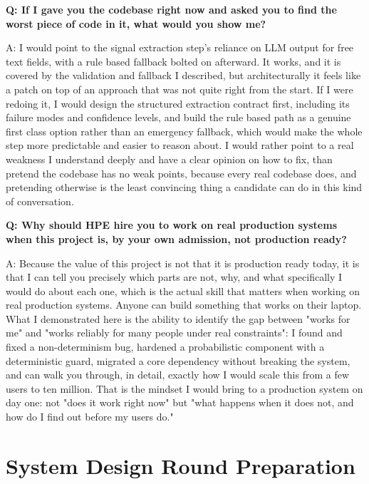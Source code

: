 \documentclass[11pt,a4paper]{report}
\begin{document}
\begin{qabox}
\textbf{Q: If I gave you the codebase right now and asked you to find the worst piece of code in it, what would you show me?}

A: I would point to the signal extraction step's reliance on LLM output for free text fields, with a rule based fallback bolted on afterward. It works, and it is covered by the validation and fallback I described, but architecturally it feels like a patch on top of an approach that was not quite right from the start. If I were redoing it, I would design the structured extraction contract first, including its failure modes and confidence levels, and build the rule based path as a genuine first class option rather than an emergency fallback, which would make the whole step more predictable and easier to reason about. I would rather point to a real weakness I understand deeply and have a clear opinion on how to fix, than pretend the codebase has no weak points, because every real codebase does, and pretending otherwise is the least convincing thing a candidate can do in this kind of conversation.
\end{qabox}

\begin{qabox}
\textbf{Q: Why should HPE hire you to work on real production systems when this project is, by your own admission, not production ready?}

A: Because the value of this project is not that it is production ready today, it is that I can tell you precisely which parts are not, why, and what specifically I would do about each one, which is the actual skill that matters when working on real production systems. Anyone can build something that works on their laptop. What I demonstrated here is the ability to identify the gap between "works for me" and "works reliably for many people under real constraints": I found and fixed a non-determinism bug, hardened a probabilistic component with a deterministic guard, migrated a core dependency without breaking the system, and can walk you through, in detail, exactly how I would scale this from a few users to ten million. That is the mindset I would bring to a production system on day one: not "does it work right now" but "what happens when it does not, and how do I find out before my users do."
\end{qabox}

\chapter{System Design Round Preparation}
\end{document}
